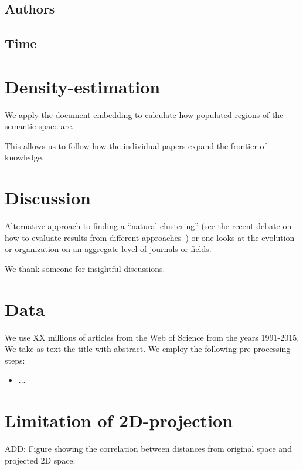 \documentclass[aps,pre,twocolumn,superscriptaddress]{revtex4-1}
\begin{document}
\subsection{Authors}

\subsection{Time}

\section{Density-estimation}
%
We apply the document embedding to calculate how populated regions of the semantic space are.

This allows us to follow how the individual papers expand the frontier of knowledge.


\section{Discussion}
%
Alternative approach to finding a ``natural clustering'' (see the recent debate on how to evaluate results from different approaches~\cite{Glaser2017}) or one looks at the evolution or organization on an aggregate level of journals or fields.



\acknowledgments
We thank someone for insightful discussions.

\appendix

\section{Data}
%
We use XX millions of articles from the Web of Science from the years 1991-2015.
We take as text the title with abstract.
We employ the following pre-processing steps:
\begin{itemize}
 \item ...
\end{itemize}

\section{Limitation of 2D-projection}
\label{sec.viz.2d.limit}
%

ADD: Figure showing the correlation between distances from original space and projected 2D space.

%


\end{document}
